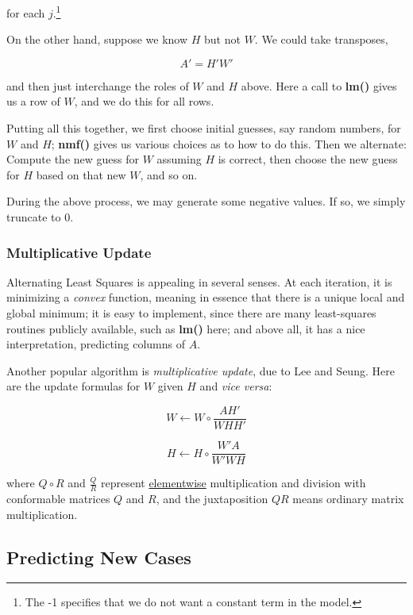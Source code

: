 for each $j$.\footnote{The -1 specifies that we do not want a constant term in
the model.}

On the other hand, suppose we know $H$ but not $W$.  We could take 
transposes,

\begin{equation}
A' = H' W'
\end{equation}

and then just interchange the roles of $W$ and $H$ above.  Here a call
to {\bf lm()} gives us a row of $W$, and we do this for all rows.

Putting all this together, we first choose initial guesses, say random
numbers, for $W$ and $H$; {\bf nmf()} gives us various choices as to how
to do this.  Then we alternate: Compute the new guess for $W$ assuming
$H$ is correct, then choose the new guess for $H$ based on that new $W$,
and so on.

During the above process, we may generate some negative values.  If so,
we simply truncate to 0.

\subsubsection{Multiplicative Update}

Alternating Least Squares is appealing in several senses.  At each
iteration, it is minimizing a {\it convex} function, meaning in essence
that there is a unique local and global minimum; it is easy to
implement, since there are many least-squares routines publicly
available, such as {\bf lm()} here; and above all, it has a nice
interpretation, predicting columns of $A$.

Another popular algorithm is {\it multiplicative update}, due to Lee and
Seung.  Here are the update formulas for $W$ given $H$ and {\it vice
versa}:

\begin{equation}
W \leftarrow W \circ 
\frac
{AH'}
{WHH'}
\end{equation}

\begin{equation}
H \leftarrow H \circ 
\frac
{W'A}
{W'WH}
\end{equation}

where $Q \circ R$ and $\frac{Q}{R}$ represent \underline{elementwise}
multiplication and division with conformable matrices $Q$ and $R$, and
the juxtaposition $QR$ means ordinary matrix multiplication.

\subsection{Predicting New Cases}

